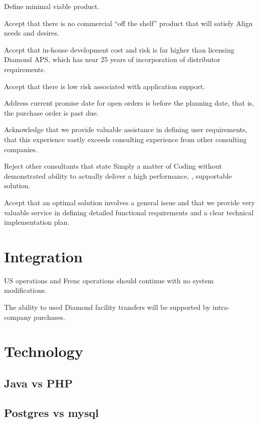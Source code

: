 \documentclass[letterpaper,10pt,english]{sphinxmanual}
\begin{document}
Define minimal  viable product.

Accept that there is no commercial “off the shelf” product that will satisfy
Align needs and desires.

Accept that in-house development cost and risk is far higher than licensing Diamond APS, which
has near 25 years of incorporation of distributor requirements.

Accept that there is low risk associated with application support.

Address current promise date for open orders is before the planning date, that is,
the purchase order is past due.

Acknowledge that we provide valuable assistance in defining user requirements, that
this experience vastly exceeds consulting experience from other consulting companies.

Reject other consultants that state  Simply a matter of Coding without demonstrated
ability to actually deliver a high performance, , supportable solution.

Accept that an optimal solution involves a general issue and that we provide very valuable
service in defining detailed functional requirements and a clear technical implementation plan.


\chapter{Integration}
\label{\detokenize{Issues:integration}}\label{\detokenize{Issues::doc}}
US operations and Frenc operations should continue with no system modifications.

The ability to used Diamond facility transfers will be supported by intra-company purchases.


\chapter{Technology}
\label{\detokenize{Technology:technology}}\label{\detokenize{Technology::doc}}

\section{Java vs PHP}
\label{\detokenize{Technology:java-vs-php}}

\section{Postgres vs mysql}
\label{\detokenize{Technology:postgres-vs-mysql}}
\end{document}
